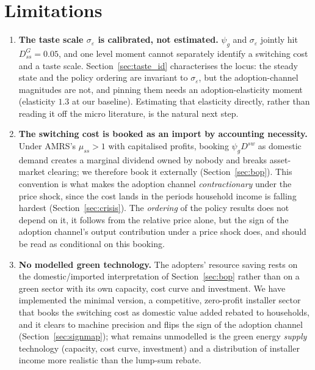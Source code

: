 \section{Limitations}
\label{sec:limits}

\begin{enumerate}\itemsep3pt

\item \textbf{The taste scale $\sigma_{\varepsilon}$ is calibrated, not
estimated.} $\psi_g$ and $\sigma_\varepsilon$ jointly hit $D^G_{ss}=0.05$, and one
level moment cannot separately identify a switching cost and a taste scale.
Section~\ref{sec:taste_id} characterises the locus: the steady state and the
policy ordering are invariant to $\sigma_\varepsilon$, but the adoption-channel
magnitudes are not, and pinning them needs an adoption-elasticity moment
(elasticity $1.3$ at our baseline). Estimating that elasticity directly, rather
than reading it off the micro literature, is the natural next step.

\item \textbf{The switching cost is booked as an import by accounting
necessity.} Under AMRS's $\mu_{ss}>1$ with capitalised profits, booking
$\psi_g D^{sw}$ as domestic demand creates a marginal dividend owned by nobody
and breaks asset-market clearing; we therefore book it externally
(Section~\ref{sec:bop}). This convention is what makes the adoption channel
\emph{contractionary} under the price shock, since the cost lands in the
periods household income is falling hardest (Section~\ref{sec:crisis}). The \emph{ordering}
of the policy results does not depend on it, it follows from the relative
price alone, but the sign of the adoption channel's output contribution under
a price shock does, and should be read as conditional on this booking.

\item \textbf{No modelled green technology.} The adopters' resource saving
rests on the domestic/imported interpretation of Section~\ref{sec:bop} rather
than on a green sector with its own capacity, cost curve and investment. We
have implemented the minimal version, a competitive, zero-profit installer
sector that books the switching cost as domestic value added rebated to
households, and it clears to machine precision and flips the sign of the
adoption channel (Section~\ref{sec:signmap}); what remains unmodelled is the
green energy \emph{supply} technology (capacity, cost curve, investment) and a
distribution of installer income more realistic than the lump-sum rebate.


\end{enumerate}
